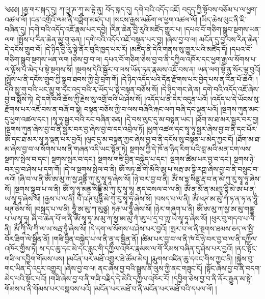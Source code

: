 ༄༅༅། །རྒྱ་གར་སྐད་དུ། ཀ་ལྱཱ་ཎ་ཀཱ་མ་དྷེ་ནུ། བོད་སྐད་དུ། དགེ་བའི་འདོད་འཇོ། བདུད་ཀྱི་སྟོབས་བཅོམ་པ་ལ་ཕྱག་འཚལ་ལོ། །ངན་འགྲོའི་ལམ་ནི་བཟློག་མཛད་པ། །སངས་རྒྱས་མཆོག་ལ་ཕྱག་འཚལ་ལོ། །ཡིད་ཆེས་ལུང་ནི་ཇི་བཞིན་དུ། །དགེ་བའི་འདོད་འཇོ་རྣམ་པར་དབྱེ། །རིན་ཆེན་བྱི་རུའི་མཛོད་གྱུར་པ། །དཔའ་བོ་གཅིག་སྒྲུབ་སྔགས་ཡན་ལག །སྤྲོས་པ་རིན་ཆེན་མྱུ་གུ་ཅན། །དགེ་བའི་འདོད་འཇོ་བསྟན་པར་བྱ། །ཞེས་བྱ་བ་ལ། མངོན་དུ་བྱ་བས་རིན་ཆེན་དེ་དངོས་གྲུབ་བོ། །དེ་ཉིད་བྱི་རུ་སྟེ་ནོར་བུའི་ཁྱད་པར་རོ། །མཛོད་ནི་དེའི་གནས་སུ་གྱུར་པའི་མཛོད་དོ། །དཔའ་བོ་གཅིག་སྒྲུབ་སྔགས་ཡན་ལག །ཅེས་བྱ་བ་ལ། དཔའ་བོ་གཅིག་ཅེས་བྱ་བ་ནི་དཀྱིལ་འཁོར་དང་ཕྱག་རྒྱ་ལ་སོགས་པ་ལ་ལྟོས་པ་མེད་པ་སྟེ་སྔགས་སོ། །སྔགས་དེའི་སྦྱོར་བ་ལས་ཡོན་ཏན་རྣམས་འཇོ་བས་ན། ཡན་ལག་སྟེ་ནུ་སོར་ལྟ་བུའོ། །སྤྲོས་པ་ནི་དངོས་གྲུབ་ཀྱི་སྒྲུབ་ཐབས་ཀྱི་བྱེ་བྲག་གོ། །དེ་ཉིད་འདོད་པའི་དོན་རྫོགས་པར་བྱེད་པས་ན་རིན་པོ་ཆེའོ། །དེའི་མྱུ་གུ་བའི་ཡང་མྱུ་གུ་དང་འདྲ་བའི་རྭ་ཡོད་པ་སྟེ་བསྟན་བཅོས་སོ། །དེ་ཉིད་གང་ཞེ་ན། དགེ་བའི་འདོད་འཇོ་ཞེས་བྱ་བ་སྨོས་ཏེ། དེ་དགེ་བའི་ཆོས་ཀྱི་རྗེས་སུ་འགྲོ་བའི་ཡེ་ཤེས་སོ། །འདོད་པ་ནི་དེར་འདུན་པའོ། །འདོད་པ་དེ་ཡོངས་སུ་རྫོགས་པར་འཇོ་བས་ན་བཞོ་བ་སྟེ། བསྟན་བཅོས་ཀྱི་བ་ལས་བཞིའི་རྐང་ལག་བཞི་དང་ལྡན་པའོ། །སྔགས་ཀུན་མང་དུ་ཕྱག་འཚལ་དང་། །སྭཱ་ཧཱ་སྦྱར་བའི་རང་བཞིན་ཅན། །དེ་བས་ལུང་དུ་མ་བསྟན་ཡང་། །ཐོག་མ་ཐ་མར་སྦྱར་བར་བྱ། །སྔགས་ཀུན་ཞེས་བྱ་བ་ནི་སྦྱར་བར་བྱ་ཞེས་བྱ་བ་དང་འབྲེལ་ཏོ། །ཕྱག་འཚལ་དང་སྭཱ་ཧཱ་སྦྱར་ཞེས་བྱ་བ་ནི་དང་པོར་ཨོཾ་དང་ཐ་མར་སྭཱ་ཧཱ་ལྡན་པར་བྱའོ། །ལུང་དུ་མ་བསྟན་ཀྱང་ཞེས་བྱ་བ་ནི་དངོས་སུ་བསྟན་པ་མེད་ཀྱང་ངོ། །ཐོག་མ་ཐ་མ་ཞེས་བྱ་བ་ལ་སོགས་པས་ནི་གཞན་འདི་ཡང་སྟོན་ཏེ། སྔགས་ཀྱི་དེ་ཁོ་ན་ཉིད་རིག་པའི་བླ་མའི་མན་ངག་ལས་སྔགས་སྤེལ་བ་དང་། སྔགས་སྤར་བ་དང་། སྔགས་གཟི་བྱིན་བསྐྱེད་པ་དང་། སྔགས་ཚིམ་པར་བྱ་བ་དང་། སྔགས་ཉེ་བར་བྱ་བ་ཤེས་པ་དག་གོ། །དེ་ལ་སྔགས་སྤེལ་བ་ནི། ཨོཾ་སཏྭ་ཆེ་གེ་མོའི་ཨུ་པ་སརྦ་ཨ་དྷི་རཀྵ་ཞེས་བྱ་བ་ནི་བསྲུང་བ་ལའོ། །ཞི་བ་ལ་ནི་ཨོཾ་ཨ་མུ་ཀ་སྱ་ཤཱནྟིཾ་ཀུ་རུ་སྭཱ་ཧཱ་ཞེས་སོ། །ཉེ་བར་བྱ་བ་ནི། ཨོཾ་ས་དྷ་སིནྣ་རྡ་བ་ན་མེ་ཀུ་རུ་སྭཱ་ཧཱ་ཞེས་སོ། །སྔགས་སྒྲུབ་པ་ལ་ནི། ཨོཾ་སྭཱ་ཧཱ་མནྟྲ་སིདྡྷིཾ་མེ་ཀུ་རུ་སྭཱ་ཧཱ། ནད་བསལ་བ་ལ་ནི། ཨོཾ་ན་མོ་ན་མཿབྱཱ་དྷི་མེ་ཨ་པ་ན་ཡ་སྭཱ་ཧཱ་ཞེས་སོ། །རྒྱས་པ་ལ་ནི། བཽ་ཥ་ཊ་པུཥྚིཾ་མེ་ཀུ་རུ་སྭཱ་ཧཱ་ཞེས་སོ། །བསད་པ་ལ་ནི། ཨོཾ་ཕཊ་ཨ་མུ་ཀཾ་ཧ་ན་ཧ་ན་ཧཱུྃ་ཕཊ་ཅེས་སོ། །བསྐྲད་པ་ལ་ནི། ཧཱུྃ་ཨ་མུ་ཀ་མུཙྩ། ཏརྐ་ཡ་ཧཱུྃ་ཞེས་སོ། །ཉེར་གཞུག་པ་ནི། ཨོཾ་ཨ་མུ་ཀ་སྱ་ཨ་མུ་གནྡྷ་པ་ཡ་སྭཱ་ཧཱ། ཞི་བ་ཆེན་པོ་ལ་ནི་ཨོཾ་སྭཱ་ཧཱ་ཨ་མུ་ཀ་སྱ་ཨ་མུ་ཀཾ་ཨུ་པ་དྲ་བ་ཀྵ་ཡེ་སྭཱ་ཧཱ་ཞེས་སོ། །ཕུར་བུ་གདབ་པ་ལ་ནི། ཨོཾ་ཀཱི་ལི་ཀཱི་ལ་ཡ་སརྦ་ཧཱུྃ་ཞེས་སོ། །དེ་དག་ལ་སོགས་པ་ཤེས་པར་བྱའོ། །སྤར་བ་ལ་ནི་སྔགས་ཐམས་ཅད་ལ་སྤྱི་བོར་ཐིག་ལེ་སྦྱིན་ནོ། །གཟི་བྱིན་བསྐྱེད་པ་ལ་ནི་ནཱ་ད་སྦྱིན་ནོ། །ཚིམ་པར་བྱ་བ་ལ་ནི་ཁཾ་ངོ་ཉེ་བར་བྱ་བ་ལ་ནི་དཀྱིལ་འཁོར་གྱིས་ཏེ། ས་དང་ཆུ་དང་མེ་དང་རླུང་གི་དཀྱིལ་འཁོར་རྣམས་ལ་གོ་རིམས་བཞིན་དུ་ཤེས་པར་བྱའོ། །ནང་སྟོང་གཟི་ལ་དབྱིག་གོམས་པས། །མངོན་པར་མཐོ་འགྱུར་ཐེ་ཚོམ་མེད། །རྨུགས་འཛིན་ཆུ་དབང་གིས་ཀྱང་ནི། །སྐྱེས་བུ་གང་ཡིན་དེ་འདྲར་འགྱུར། །ཞེས་བྱ་བ་ལ། ནང་ཞེས་བྱ་བའི་སྒྲས་ནི་ལུས་ཀྱི་ནང་གཟུང་ངོ། །སྟོང་ཞེས་བྱ་བ་ནི་བདག་མེད་པའི་སྟོང་པའོ། །གཟི་ཞེས་བྱ་བ་ནི་གཟི་བརྗིད་དེ་མེའི་དཀྱིལ་འཁོར་རོ། །དབྱིག་ཅེས་བྱ་བ་ནི་ནོར་རྒྱུན་མ་སྟེ་གོམས་པ་ནི་གོམས་པར་བསླབས་པའོ། །མངོན་པར་མཐོ་བ་ནི་མངོན་པར་མཐོ་བའི་དཔལ་ལོ། །
